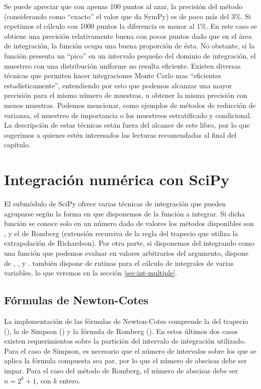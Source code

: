 Se puede apreciar que con apenas 100 puntos al azar, la precisión del método (considerando como ``exacto'' el valor que da SymPy) es de poco más del 3\%. Si repetimos el cálculo con 1000 puntos la diferencia es menor al 1\%. En este caso se obtiene una precisión relativamente buena con pocos puntos dado que en el área de integración, la función ocupa una buena proporción de ésta. No obstante, si la función presenta un ``pico'' en un intervalo pequeño del dominio de integración, el muestreo con una distribución uniforme no resulta eficiente. Existen diversas técnicas que permiten hacer integraciones Monte Carlo mas ``eficientes estadísticamente'', entendiendo por esto que podemos alcanzar una mayor precisión para el mismo número de muestras, u obtener la misma precisión con menos muestras. Podemos mencionar, como ejemplos de métodos de reducción de varianza, el muestreo de importancia o los muestreos estratificado y condicional. La descripción de estas técnicas están fuera del alcance de este libro, por lo que sugerimos a quienes estén interesados las lecturas recomendadas al final del capítulo.


\section{Integración numérica con SciPy}\label{sec:intScipy}

El submódulo  de SciPy ofrece varias técnicas de integración que pueden agruparse según la forma en que disponemos de la función a integrar. Si dicha función se conoce solo en un número dado de valores los métodos disponibles son ,  y el de Romberg  (extensión recursiva de la regla del trapecio que utiliza la extrapolación de Richardson). Por otra parte, si disponemos del integrando como una función que podemos evaluar en valores arbitrarios del argumento,  dispone de , ,  y .  también dispone de rutinas para el cálculo de integrales de varias variables, lo que veremos en la sección \ref{sec:int-multiple}.


\subsection{Fórmulas de Newton-Cotes}
La implementación de las fórmulas de Newton-Cotes comprende la del trapecio (), la de Simpson () y la fórmula de Romberg (). En estos últimos dos casos existen requerimientos sobre la partición del intervalo de integración utilizado. Para el caso de Simpson, es necesario que el número de intervalos sobre los que se aplica la fórmula compuesta sea par, por lo que el número de abscisas debe ser impar. Para el caso del método de Romberg, el número de abscisas debe ser $n = 2^k + 1$, con $k$ entero.

